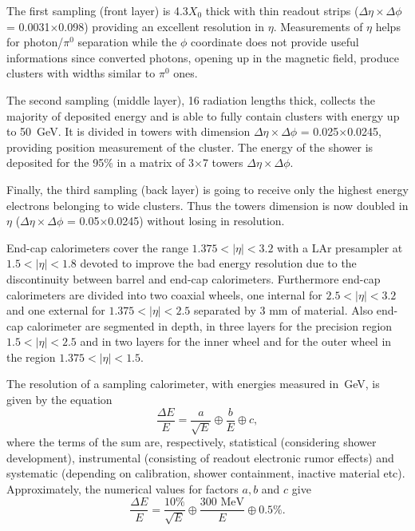The first sampling (front layer) is 4.3$X_{0}$ thick with thin readout strips ($\Delta\eta\times\Delta\phi$ = 0.0031$\times$0.098) providing an excellent resolution in $\eta$. Measurements of $\eta$ helps for photon/$\pi^{0}$ separation while the $\phi$ coordinate does not provide useful informations since converted photons, opening up in the magnetic field, produce clusters with widths similar to $\pi^{0}$ ones.

The second sampling (middle layer), 16 radiation lengths thick, collects the majority of deposited energy and is able to fully contain clusters with energy up to 50~GeV. It is divided in towers with dimension $\Delta\eta\times\Delta\phi$ = 0.025$\times$0.0245, providing position measurement of the cluster. The energy of the shower is deposited for the 95\% in a matrix of 3$\times$7 towers $\Delta\eta\times\Delta\phi$.

Finally, the third sampling (back layer) is going to receive only the highest energy electrons belonging to wide clusters. Thus the towers dimension is now doubled in $\eta$ ($\Delta\eta\times\Delta\phi$ = 0.05$\times$0.0245) without losing in resolution.

End-cap calorimeters cover the range $ 1.375 < |\eta| < 3.2$ with a LAr presampler at $1.5<|\eta|<1.8$ devoted to improve the bad energy resolution due to the discontinuity between barrel and end-cap calorimeters. Furthermore end-cap calorimeters are divided into two coaxial wheels, one internal for $ 2.5 < |\eta| < 3.2$ and one external for $1.375 < |\eta| < 2.5$ separated by 3 mm of material. Also end-cap calorimeter are segmented in depth, in three layers for the precision region $1.5 < |\eta| < 2.5$ and in two layers for the inner wheel and for the outer wheel in the region $1.375 < |\eta| < 1.5$.

The resolution of a sampling calorimeter, with energies measured in~GeV, is given by the equation
\begin{equation}\label{eq:resolution}
\frac{\Delta E}{E} = \frac{a}{\sqrt{E}}\oplus\frac{b}{E}\oplus c,
\end{equation} where the terms of the sum are, respectively, statistical (considering shower development), instrumental (consisting of readout electronic rumor effects) and systematic (depending on calibration, shower containment, inactive material etc). Approximately, the numerical values for factors $a, b$ and $c$ give
\begin{equation}\label{eq:resolution2}
\frac{\Delta E}{E} = \frac{10\%}{\sqrt{E}}\oplus\frac{300\mbox{ MeV}}{E}\oplus 0.5\%.
\end{equation}

